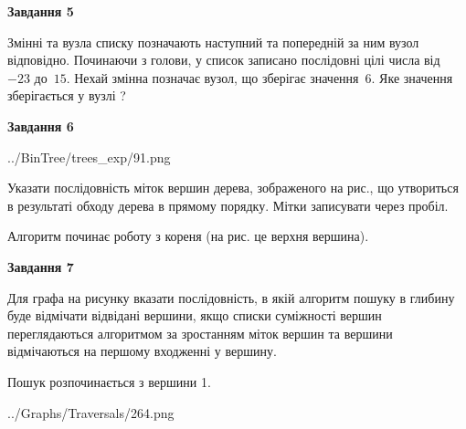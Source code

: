 \documentclass[12pt, ukrainian]{article}
\begin{document}
{\begin {large}
{\begin {center}\textbf{Завдання 5}\end {center}}\par
Змінні  та  вузла списку позначають наступний та попередній за ним вузол відповідно. Починаючи з голови, у список записано послідовні цілі числа від~$-23$ до~$15$. Нехай змінна  позначає вузол, що зберігає значення~$6$.
Яке значення зберігається у вузлі  ?\par
\newpage

{\begin {center}\textbf{Завдання 6}\end {center}}\par

\begin{center}
	{../BinTree/trees_exp/91.png}
\end{center}
Указати послідовність міток вершин дерева, зображеного на рис., що утвориться в результаті обходу дерева в прямому порядку. Мітки записувати через пробіл.\par Алгоритм починає роботу з кореня (на рис. це верхня вершина).\par
\newpage

{\begin {center}\textbf{Завдання 7}\end {center}}\par
Для графа на рисунку вказати послідовність, в якій алгоритм пошуку в глибину буде відмічати відвідані вершини, якщо списки суміжності вершин переглядаються алгоритмом за зростанням міток вершин та вершини відмічаються на першому вход\-женні у вершину.\par
Пошук розпочинається з вершини 1.\par

\begin{center}
	{../Graphs/Traversals/264.png}
\end{center}\par
\newpage


\end{large}}
\end{document}
